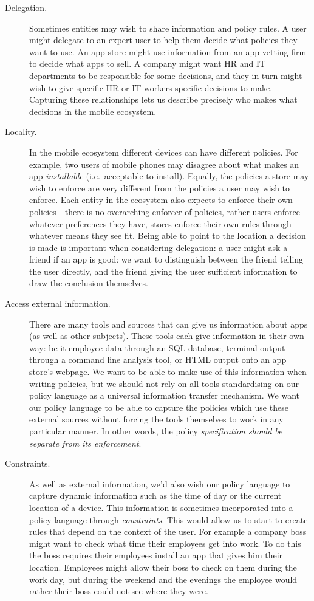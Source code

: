\documentclass[thesis.tex]{subfiles}
\begin{document}
\begin{description}
\item[Delegation.] Sometimes entities may wish to
share information and policy rules. A user might delegate to an
expert user to help them decide what policies they want to use. An app
store might use information from an app vetting firm to decide what
apps to sell. A company might want HR and IT departments to be
responsible for some decisions, and they in turn might wish to give
specific HR or IT workers specific decisions to make. Capturing these
relationships lets us describe precisely who makes what decisions in
the mobile ecosystem.

\item[Locality.] In the mobile ecosystem different devices can have
different policies. For example, two users of mobile phones may
disagree about what makes an app \emph{installable}
(i{.}e{.}~acceptable to install). Equally, the policies a store may
wish to enforce are very different from the policies a user may wish
to enforce. Each entity in the ecosystem also expects to enforce their
own policies---there is no overarching enforcer of policies, rather
users enforce whatever preferences they have, stores enforce their own
rules through whatever means they see fit. Being able to point to the
location a decision is made is important when considering delegation:
a user might ask a friend if an app is good: we want to distinguish
between the friend telling the user directly, and the friend giving
the user sufficient information to draw the conclusion themselves.

\item[Access external information.] There are many tools and sources
that can give us information about apps (as well as other
subjects). These tools each give information in their own way: be it
employee data through an SQL database, terminal output through a
command line analysis tool, or HTML output onto an app store's
webpage. We want to be able to make use of this information when
writing policies, but we should not rely on all tools standardising on
our policy language as a universal information transfer mechanism. We
want our policy language to be able to capture the policies which use
these external sources without forcing the tools themselves to work in
any particular manner. In other words, the policy \emph{specification
should be separate from its enforcement}.

\item[Constraints.] As well as external information, we'd also wish
our policy language to capture dynamic information such as the time of
day or the current location of a device. This information is sometimes
incorporated into a policy language through \emph{constraints}. This
would allow us to start to create rules that depend on the context of
the user. For example a company boss might want to check what time
their employees get into work. To do this the boss requires their
employees install an app that gives him their location. Employees
might allow their boss to check on them during the work day, but
during the weekend and the evenings the employee would rather their
boss could not see where they were.


\end{description}
\end{document}
